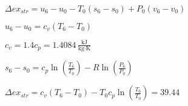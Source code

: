 \( \Delta ex_{str} = u_6 - u_0 - T_0 (s_6 - s_0) + P_0 (v_6 - v_0) \)  

\( u_6 - u_0 = c_v (T_6 - T_0) \)  

\( c_v = 1.4 c_p = 1.4084 \, \frac{\text{kJ}}{\text{kg·K}} \)  

\( s_6 - s_0 = c_p \ln \left( \frac{T_6}{T_0} \right) - R \ln \left( \frac{P_6}{P_0} \right) \)  

\( \Delta ex_{str} = c_v (T_6 - T_0) - T_0 c_p \ln \left( \frac{T_6}{T_0} \right) = 39.44 \)